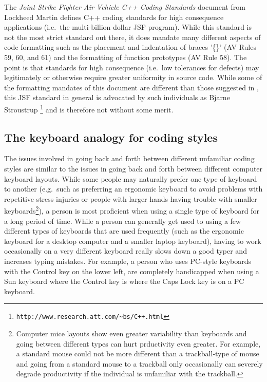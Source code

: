 The {}\textit{Joint Strike Fighter Air Vehicle C++ Coding Standards} document
{}\cite{JSFAVC++CodingStandards2005} from Lockheed Martin defines C++ coding
standards for high consequence applications (i.e.\ the multi-billion dollar
JSF program).  While this standard is not the most strict standard out there,
it does mandate many different aspects of code formatting such as the
placement and indentation of braces '\{\}' (AV Rules 59, 60, and 61) and the
formatting of function prototypes (AV Rule 58).  The point is that standards
for high consequence (i.e.\ low tolerances for defects) may legitimately or
otherwise require greater uniformity in source code.  While some of the
formatting mandates of this document are different than those suggested in
{}\cite[Chapter 31]{CodeComplete2nd04}, this JSF standard in general is
advocated by such individuals as Bjarne Stroustrup
{}\footnote{{}\texttt{http://www.research.att.com/\~{}bs/C++.html}} and is
therefore not without some merit.

%
\subsection{The keyboard analogy for coding styles}
%

The issues involved in going back and forth between different unfamiliar
coding styles are similar to the issues in going back and forth between
different computer keyboard layouts.  While some people may naturally prefer
one type of keyboard to another (e.g.\ such as preferring an ergonomic
keyboard to avoid problems with repetitive stress injuries or people with
larger hands having trouble with smaller keyboards\footnote{Computer mice
layouts show even greater variability than keyboards and going between
different types can hurt prductivity even greater.  For example, a standard
mouse could not be more different than a trackball-type of mouse and going
from a standard mouse to a trackball only occasionally can severely degrade
productivity if the individual is unfamiliar with the trackball.}), a person
is most proficient when using a single type of keyboard for a long period of
time.  While a person can generally get used to using a few different types of
keyboards that are used frequently (such as the ergonomic keyboard for a
desktop computer and a smaller laptop keyboard), having to work occasionally
on a very different keyboard really slows down a good typer and increases
typing mistakes.  For example, a person who uses PC-style keyboards with the
Control key on the lower left, are completely handicapped when using a Sun
keyboard where the Control key is where the Caps Lock key is on a PC keyboard.

